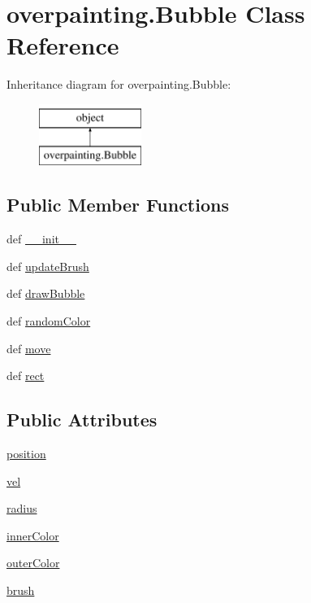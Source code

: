 \hypertarget{classoverpainting_1_1Bubble}{}\section{overpainting.\+Bubble Class Reference}
\label{classoverpainting_1_1Bubble}
Inheritance diagram for overpainting.\+Bubble\+:\begin{figure}[H]
\begin{center}
\leavevmode
\includegraphics[height=2.000000cm]{classoverpainting_1_1Bubble}
\end{center}
\end{figure}
\subsection*{Public Member Functions}
\begin{DoxyCompactItemize}
\item 
def \hyperlink{classoverpainting_1_1Bubble_a80a4a9c267bdce37655c52ea1cc7ef32}{\+\_\+\+\_\+init\+\_\+\+\_\+}
\item 
def \hyperlink{classoverpainting_1_1Bubble_a3e4c3363b8ba01477172a8482d2e190d}{update\+Brush}
\item 
def \hyperlink{classoverpainting_1_1Bubble_a531406385e4258ddca65fa82eb702188}{draw\+Bubble}
\item 
def \hyperlink{classoverpainting_1_1Bubble_a9354211775af924fe2fbf098dbdacc1f}{random\+Color}
\item 
def \hyperlink{classoverpainting_1_1Bubble_a3d482ef3b92351e2cce38415b657209f}{move}
\item 
def \hyperlink{classoverpainting_1_1Bubble_a236b7fb986cd164f4be8d2815b307673}{rect}
\end{DoxyCompactItemize}
\subsection*{Public Attributes}
\begin{DoxyCompactItemize}
\item 
\hyperlink{classoverpainting_1_1Bubble_a373fb587e6fa3f3325d7236166edd9b1}{position}
\item 
\hyperlink{classoverpainting_1_1Bubble_a215ee0649d4a2a14a2ca63b8da9d7d2c}{vel}
\item 
\hyperlink{classoverpainting_1_1Bubble_a7f0da47640471540208356801e799c11}{radius}
\item 
\hyperlink{classoverpainting_1_1Bubble_a364446fcb0720f3c68a302d8238b7cce}{inner\+Color}
\item 
\hyperlink{classoverpainting_1_1Bubble_a32db50c409b58685a12389ee12e4f900}{outer\+Color}
\item 
\hyperlink{classoverpainting_1_1Bubble_a80de43aa2c73d1c94eaae698b83831b9}{brush}
\end{DoxyCompactItemize}



